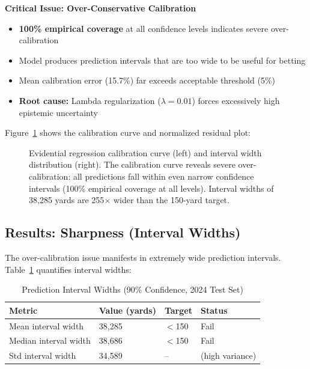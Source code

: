 \noindent \textbf{Critical Issue: Over-Conservative Calibration}
\begin{itemize}[nosep]
    \item \textbf{100\% empirical coverage} at all confidence levels indicates severe over-calibration
    \item Model produces prediction intervals that are too wide to be useful for betting
    \item Mean calibration error (15.7\%) far exceeds acceptable threshold (5\%)
    \item \textbf{Root cause:} Lambda regularization ($\lambda=0.01$) forces excessively high epistemic uncertainty
\end{itemize}

Figure~\ref{fig:evidential_calibration} shows the calibration curve and normalized residual plot:

\begin{figure}[htbp]
    \centering
    
    \caption{Evidential regression calibration curve (left) and interval width distribution (right). The calibration curve reveals severe over-calibration: all predictions fall within even narrow confidence intervals (100\% empirical coverage at all levels). Interval widths of 38,285 yards are 255$\times$ wider than the 150-yard target.}
    \label{fig:evidential_calibration}
\end{figure}

\subsection{Results: Sharpness (Interval Widths)}

The over-calibration issue manifests in extremely wide prediction intervals. Table~\ref{tab:evidential_sharpness} quantifies interval widths:

\begin{table}[htbp]
\centering
\caption{Prediction Interval Widths (90\% Confidence, 2024 Test Set)}
\label{tab:evidential_sharpness}
\begin{tabular}{llll}
\toprule
\textbf{Metric} & \textbf{Value (yards)} & \textbf{Target} & \textbf{Status} \\
\midrule
Mean interval width & 38,285 & $<$150 & Fail \\
Median interval width & 38,686 & $<$150 & Fail \\
Std interval width & 34,589 & -- & (high variance) \\
\bottomrule
\end{tabular}
\end{table}

